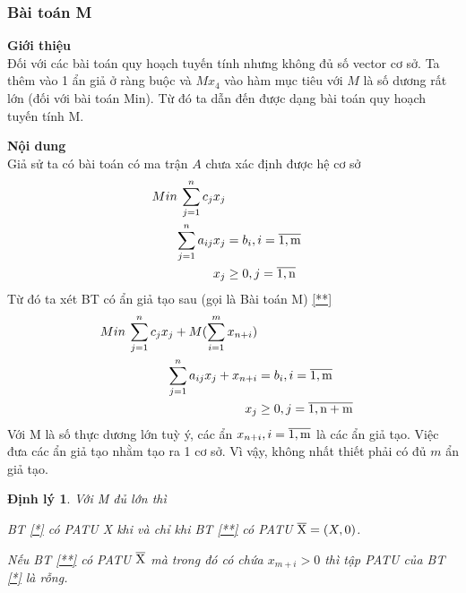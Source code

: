 \documentclass{article}
\newtheorem{dl}{Định lý}
\begin{document}
            \subsubsection{Bài toán M}
                \begin{enumerate}
                    \item \textbf{Giới thiệu} \\
                        Đối với các bài toán quy hoạch tuyến tính nhưng không đủ số vector cơ sở. Ta thêm vào 1 ẩn giả ở ràng buộc và $Mx_4$ vào hàm mục tiêu với $M$ là số dương rất lớn (đối với bài toán Min). Từ đó ta dẫn đến được dạng bài toán quy hoạch tuyến tính M.
                    \item \textbf{Nội dung} \\
                        Giả sử ta có bài toán có ma trận $A$ chưa xác định được hệ cơ sở
                            \begin{equation} \label{*}
                                \begin{split}
                                    Min \: \sum_{j=1}^n c_jx_j \\
                                    \sum_{j=1}^n a_{ij}x_j&=b_i , i = \overline{\rm 1,m} \\
                                    x_j &\geq 0 , j = \overline{\rm 1,n} \\
                                \end{split}
                            \end{equation}
                        Từ đó ta xét BT có ẩn giả tạo sau (gọi là Bài toán M) \eqref{**}
                            \begin{equation} \label{**}
                                \begin{split}
                                    Min \: \sum_{j=1}^n c_jx_j+M(\sum_{i=1}^m x_{n+i}) \\
                                    \sum_{j=1}^n a_{ij}x_j + x_{n+i}&=b_i , i = \overline{\rm 1,m} \\
                                    x_j &\geq 0 , j= \overline{\rm 1,{n+m}}
                                \end{split}
                            \end{equation}
                        Với M là số thực dương lớn tuỳ ý, các ẩn $x_{n+i} , i=\overline{\rm 1,m}$ là các ẩn giả tạo. Việc đưa các ẩn giả tạo nhằm tạo ra 1 cơ sở. Vì vậy, không nhất thiết phải có đủ $m$ ẩn giả tạo.
                            \begin{dl}
                                Với M đủ lớn thì
                                \item BT \eqref{*}  có PATU X khi và chỉ khi BT \eqref{**} có PATU $\overline{\rm X} = (X,0)$.
                                \item Nếu BT \eqref{**} có PATU $\overline{\rm X}$ mà trong đó có chứa $x_{m+i}>0$ thì tập PATU của BT \eqref{*} là rỗng.
                            \end{dl}
                        

\end{enumerate}
\end{document}
